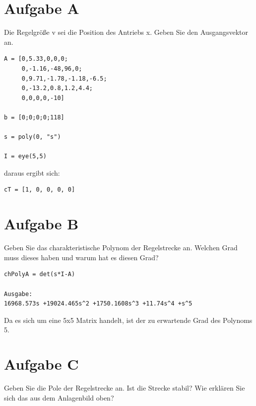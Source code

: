 









\clearpage








\section{Aufgabe A}
Die Regelgröße v sei die Position des Antriebs x. Geben Sie den Ausgangsvektor an. 
\begin{lstlisting}[caption = Gegebene Matritzen aus der Aufgabe, captionpos = b, label = lst:example]
A = [0,5.33,0,0,0; 
     0,-1.16,-48,96,0; 
     0,9.71,-1.78,-1.18,-6.5;
     0,-13.2,0.8,1.2,4.4;
     0,0,0,0,-10]

b = [0;0;0;0;118]

s = poly(0, "s")

I = eye(5,5)
\end{lstlisting}
daraus ergibt sich:
\begin{lstlisting}[caption = Ausgangsvektor cT, captionpos = b, label = lst:example]
cT = [1, 0, 0, 0, 0]\end{lstlisting}




\section{Aufgabe B} 
Geben Sie das charakteristische Polynom der Regelstrecke an. Welchen Grad muss dieses haben und warum hat es diesen Grad?


\begin{lstlisting}[caption = charakteristisches Polynom, captionpos = b, label = lst:example]
chPolyA = det(s*I-A)

Ausgabe:
16968.573s +19024.465s^2 +1750.1608s^3 +11.74s^4 +s^5
\end{lstlisting}
Da es sich um eine 5x5 Matrix handelt, ist der zu erwartende Grad des Polynoms 5.

\clearpage
\section{Aufgabe C}
Geben Sie die Pole der Regelstrecke an. Ist die Strecke stabil? Wie erklären Sie sich das aus dem Anlagenbild oben?

